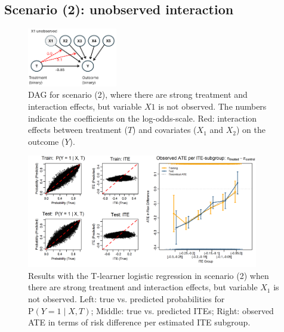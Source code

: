\clearpage



\subsection{Scenario (2): unobserved interaction}

\begin{figure}[htbp]
\centering
\includegraphics[width=0.35\textwidth]{img/results_ITE_simulation/simulation_unobserved.png}
\caption{DAG for scenario (2), where there are strong treatment and interaction effects, but variable $X1$ is not observed. The numbers indicate the coefficients on the log-odds-scale. Red: interaction effects between treatment ($T$) and covariates ($X_1$ and $X_2$) on the outcome ($Y$).}
\label{fig:unobserved_interaction_dag}
\end{figure}



\begin{figure}[htbp]
\centering
\includegraphics[width=0.9\textwidth]{img/results_ITE_simulation/unobserved_interaction_glm_tlearner.png}
\caption{Results with the T-learner logistic regression in scenario (2) when there are strong treatment and interaction effects, but variable $X_1$ is not observed. Left: true vs. predicted probabilities for $\text{P}(Y=1 \mid X, T)$; Middle: true vs. predicted ITEs; Right: observed ATE in terms of risk difference per estimated ITE subgroup.}
\label{fig:unobserved_interaction_glm_tlearner}
\end{figure}



